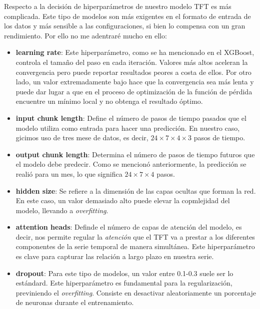 %
%
%
Respecto a la decisión de hiperparámetros de nuestro modelo TFT es más complicada. Este tipo de modelos son más exigentes en el formato de entrada de los datos y más sensible a las configuraciones, si bien lo compensa con un gran rendimiento. Por ello no me adentraré mucho en ello:
\begin{itemize}
    \item \textbf{learning rate}: Este hiperparámetro, como se ha mencionado en el XGBoost, controla el tamaño del paso en cada iteración. Valores más altos aceleran la convergencia pero puede reportar resultados peores a costa de ellos. Por otro lado, un valor extremadamente bajo hace que la convergencia sea más lenta y puede dar lugar a que en el proceso de optimización de la función de pérdida encuentre un mínimo local y no obtenga el resultado óptimo.
    
    \item \textbf{input chunk length}: Define el número de pasos de tiempo pasados que el modelo utiliza como entrada para hacer una predicción. En nuestro caso, gicimos uso de tres mese de datos, es decir, $24 \times 7 \times 4 \times 3$ pasos de tiempo.
    \item \textbf{output chunk length}: Determina el número de pasos de tiempo futuros que el modelo debe predecir. Como se mencionó anteriormente, la predicción se realió para un mes, lo que significa $24 \times 7 \times 4$ pasos.
     
    \item \textbf{hidden size}: Se refiere a la dimensión de las capas ocultas que forman la red. En este caso, un valor demasiado alto puede elevar la copmlejidad del modelo, llevando a \textit{overfitting}.
     
    \item \textbf{attention heads}: Definde el número de capas de atención del modelo, es decir, nos permite regular la \textit{atención} que el TFT va a prestar a los diferentes componentes de la serie temporal de manera simultánea. Este hiperparámetro es clave para capturar las relación a largo plazo en nuestra serie.
     
    \item \textbf{dropout}: Para este tipo de modelos, un valor entre 0.1-0.3 suele ser lo estándard. Este hiperparámetro es fundamental para la regularización, previniendo el \textit{overfitting}. Consiste en desactivar aleatoriamente un porcentaje de neuronas durante el entrenamiento.
\end{itemize}


